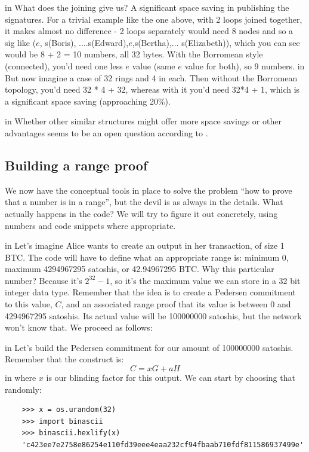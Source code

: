 \documentclass[10pt,a4paper]{article}
\begin{document}
 in \noindent What does the joining give us? A significant space saving in publishing the signatures. For a trivial example like the one above, with 2 loops joined together, it makes almost no difference - 2 loops separately would need 8 nodes and so a sig like ($e$, s(Boris), ....s(Edward),$e$,s(Bertha),... s(Elizabeth)), which you can see would be 8 + 2 = 10 numbers, all 32 bytes. With the Borromean style (connected), you'd need one less $e$ value (same $e$ value for both), so 9 numbers.
 in \noindent But now imagine a case of 32 rings and 4 in each. Then without the Borromean topology, you'd need 32 * 4 + 32, whereas with it you'd need 32*4 + 1, which is a significant space saving (approaching 20\%).

 in \noindent Whether other similar structures might offer more space savings or other advantages seems to be an open question according to \cite{borromean}.

\subsection{Building a range proof}

We now have the conceptual tools in place to solve the problem ``how to prove that a number is in a range'', but the devil is as always in the details. What actually happens in the code? We will try to figure it out concretely, using numbers and code snippets where appropriate.

 in \noindent Let's imagine Alice wants to create an output in her transaction, of size 1 BTC. The code will have to define what an appropriate range is: minimum 0, maximum 4294967295 satoshis, or 42.94967295 BTC. Why this particular number? Because it's $2^{32}-1$, so it's the maximum value we can store in a 32 bit integer data type. Remember that the idea is to create a Pedersen commitment to this value, $C$, and an associated range proof that its value is between 0 and 4294967295 satoshis. Its actual value will be 100000000 satoshis, but the network won't know that. We proceed as follows:

 in \noindent Let's build the Pedersen commitment for our amount of 100000000 satoshis. Remember that the construct is:
\[C = xG + aH \]
 in \noindent where $x$ is our blinding factor for this output. We can start by choosing that randomly:
\begin{verbatim}
	>>> x = os.urandom(32)
	>>> import binascii
	>>> binascii.hexlify(x)
	'c423ee7e2758e86254e110fd39eee4eaa232cf94fbaab710fdf811586937499e'
\end{verbatim}
\end{document}
